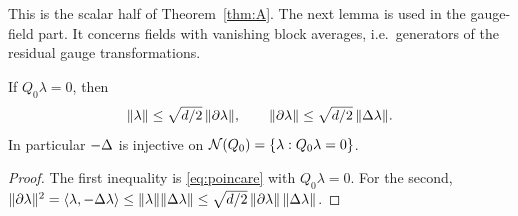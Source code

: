This is the scalar half of Theorem~\ref{thm:A}. The next lemma is used in the gauge-field part. It concerns fields with vanishing block averages, i.e.\ generators of the residual gauge transformations.

\begin{lemma}\label{lem:kerQ0}
If $Q_0\lambda=0$, then
\[
\|\lambda\|\le\sqrt{d/2}\,\|\partial\lambda\|,\qquad \|\partial\lambda\|\le\sqrt{d/2}\,\|\Delta\lambda\| .
\]
In particular $-\Delta$ is injective on $\mathcal N(Q_0)=\{\lambda:Q_0\lambda=0\}$.
\end{lemma}

\begin{proof}
The first inequality is \eqref{eq:poincare} with $Q_0\lambda=0$. For the second, $\|\partial\lambda\|^2=\langle \lambda,-\Delta\lambda\rangle\le\|\lambda\|\|\Delta\lambda\|\le\sqrt{d/2}\,\|\partial\lambda\|\,\|\Delta\lambda\|$.
\end{proof}
